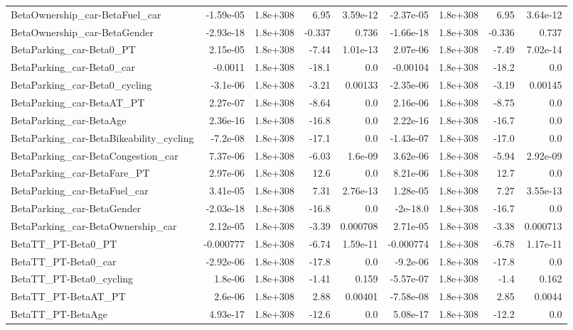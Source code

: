 \begin{tabular}{lrrrrrrrr}
BetaOwnership_car-BetaFuel_car & -1.59e-05 & 1.8e+308 & 6.95 & 3.59e-12 & -2.37e-05 & 1.8e+308 & 6.95 & 3.64e-12 \\
BetaOwnership_car-BetaGender & -2.93e-18 & 1.8e+308 & -0.337 & 0.736 & -1.66e-18 & 1.8e+308 & -0.336 & 0.737 \\
BetaParking_car-Beta0_PT & 2.15e-05 & 1.8e+308 & -7.44 & 1.01e-13 & 2.07e-06 & 1.8e+308 & -7.49 & 7.02e-14 \\
BetaParking_car-Beta0_car & -0.0011 & 1.8e+308 & -18.1 & 0.0 & -0.00104 & 1.8e+308 & -18.2 & 0.0 \\
BetaParking_car-Beta0_cycling & -3.1e-06 & 1.8e+308 & -3.21 & 0.00133 & -2.35e-06 & 1.8e+308 & -3.19 & 0.00145 \\
BetaParking_car-BetaAT_PT & 2.27e-07 & 1.8e+308 & -8.64 & 0.0 & 2.16e-06 & 1.8e+308 & -8.75 & 0.0 \\
BetaParking_car-BetaAge & 2.36e-16 & 1.8e+308 & -16.8 & 0.0 & 2.22e-16 & 1.8e+308 & -16.7 & 0.0 \\
BetaParking_car-BetaBikeability_cycling & -7.2e-08 & 1.8e+308 & -17.1 & 0.0 & -1.43e-07 & 1.8e+308 & -17.0 & 0.0 \\
BetaParking_car-BetaCongestion_car & 7.37e-06 & 1.8e+308 & -6.03 & 1.6e-09 & 3.62e-06 & 1.8e+308 & -5.94 & 2.92e-09 \\
BetaParking_car-BetaFare_PT & 2.97e-06 & 1.8e+308 & 12.6 & 0.0 & 8.21e-06 & 1.8e+308 & 12.7 & 0.0 \\
BetaParking_car-BetaFuel_car & 3.41e-05 & 1.8e+308 & 7.31 & 2.76e-13 & 1.28e-05 & 1.8e+308 & 7.27 & 3.55e-13 \\
BetaParking_car-BetaGender & -2.03e-18 & 1.8e+308 & -16.8 & 0.0 & -2e-18.0 & 1.8e+308 & -16.7 & 0.0 \\
BetaParking_car-BetaOwnership_car & 2.12e-05 & 1.8e+308 & -3.39 & 0.000708 & 2.71e-05 & 1.8e+308 & -3.38 & 0.000713 \\
BetaTT_PT-Beta0_PT & -0.000777 & 1.8e+308 & -6.74 & 1.59e-11 & -0.000774 & 1.8e+308 & -6.78 & 1.17e-11 \\
BetaTT_PT-Beta0_car & -2.92e-06 & 1.8e+308 & -17.8 & 0.0 & -9.2e-06 & 1.8e+308 & -17.8 & 0.0 \\
BetaTT_PT-Beta0_cycling & 1.8e-06 & 1.8e+308 & -1.41 & 0.159 & -5.57e-07 & 1.8e+308 & -1.4 & 0.162 \\
BetaTT_PT-BetaAT_PT & 2.6e-06 & 1.8e+308 & 2.88 & 0.00401 & -7.58e-08 & 1.8e+308 & 2.85 & 0.0044 \\
BetaTT_PT-BetaAge & 4.93e-17 & 1.8e+308 & -12.6 & 0.0 & 5.08e-17 & 1.8e+308 & -12.2 & 0.0 \\

\end{tabular}
